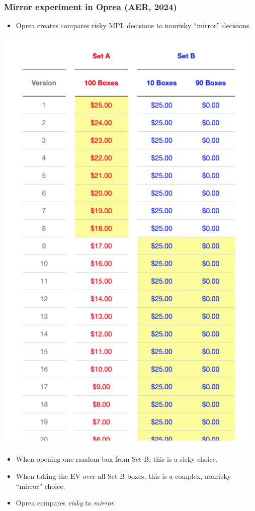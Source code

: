 \documentclass[
  letterpaper,
  DIV=11,
  numbers=noendperiod]{scrartcl}
\providecommand{\tightlist}{%
  \setlength{\itemsep}{0pt}\setlength{\parskip}{0pt}}\usepackage{longtable,booktabs,array}
\begin{document}
\subsubsection{Mirror experiment in Oprea (AER,
2024)}\label{mirror-experiment-in-oprea-aer-2024-1}

\begin{itemize}
\tightlist
\item
  Oprea creates compares risky MPL decisions to nonrisky ``mirror''
  decisions.
\end{itemize}

\includegraphics[width=0.85\linewidth,height=\textheight,keepaspectratio]{figures/SimplicityEquivalentsMPL.png}

\begin{itemize}
\tightlist
\item
  When opening one random box from Set B, this is a risky choice.
\item
  When taking the EV over all Set B boxes, this is a complex, nonrisky
  ``mirror'' choice.
\item
  Oprea compares \emph{risky} to \emph{mirror}.
\end{itemize}
\end{document}
